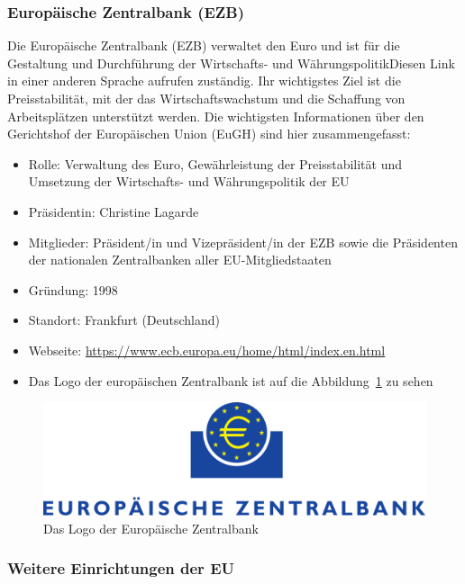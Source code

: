 \subsubsection{Europäische Zentralbank (EZB) }\label{subsubsec:EuroZentralBank}

Die Europäische Zentralbank (EZB) verwaltet den Euro und ist für die Gestaltung und Durchführung der Wirtschafts- und WährungspolitikDiesen Link in einer anderen Sprache aufrufen zuständig. Ihr wichtigstes Ziel ist die Preisstabilität, mit der das Wirtschaftswachstum und die Schaffung von Arbeitsplätzen unterstützt werden.\newline
Die wichtigsten Informationen über den Gerichtshof der Europäischen Union (EuGH) sind hier zusammengefasst:
\begin{itemize}
  \item Rolle: Verwaltung des Euro, Gewährleistung der Preisstabilität und Umsetzung der Wirtschafts- und Währungspolitik der EU
  \item Präsidentin: Christine Lagarde
  \item Mitglieder: Präsident/in und Vizepräsident/in der EZB sowie die Präsidenten der nationalen Zentralbanken aller EU-Mitgliedstaaten
  \item Gründung: 1998
  \item Standort: Frankfurt (Deutschland)
  \item Webseite: \url{https://www.ecb.europa.eu/home/html/index.en.html}
  \item Das Logo der europäischen Zentralbank ist auf die Abbildung~\ref{fig:logoEuroZentralBank} zu sehen
\end{itemize}

\begin{figure}[H]
\centering
    \includegraphics[width=.9\textwidth]{images/Euro_Zentralbank.png}
    \caption{Das Logo der Europäische Zentralbank}
    \label{fig:logoEuroZentralBank}
\end{figure}

\subsubsection{Weitere Einrichtungen der EU}\label{subsubsec:weitereEinrichtungen}

